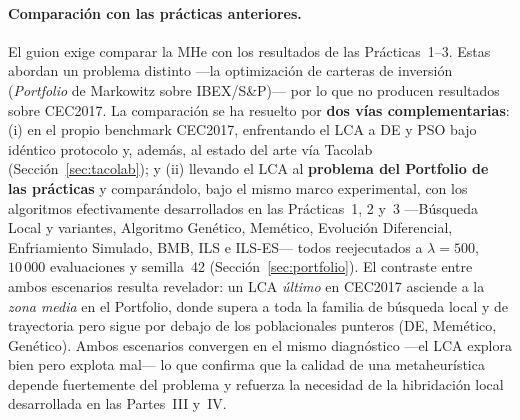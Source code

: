 \paragraph{Comparación con las prácticas anteriores.}
El guion exige comparar la MHe con los resultados de las Prácticas~1--3. Estas
abordan un problema distinto ---la optimización de carteras de inversión
(\emph{Portfolio} de Markowitz sobre IBEX/S\&P)--- por lo que no producen
resultados sobre CEC2017. La comparación se ha resuelto por \textbf{dos vías
complementarias}: (i) en el propio benchmark CEC2017, enfrentando el LCA a DE y
PSO bajo idéntico protocolo y, además, al estado del arte vía Tacolab
(Sección~\ref{sec:tacolab}); y (ii) llevando el LCA al \textbf{problema del
Portfolio de las prácticas} y comparándolo, bajo el mismo marco experimental, con
los algoritmos efectivamente desarrollados en las Prácticas~1, 2 y~3 ---Búsqueda
Local y variantes, Algoritmo Genético, Memético, Evolución Diferencial,
Enfriamiento Simulado, BMB, ILS e ILS-ES--- todos reejecutados a $\lambda=500$,
$10\,000$ evaluaciones y semilla~42 (Sección~\ref{sec:portfolio}). El contraste
entre ambos escenarios resulta revelador: un LCA \emph{último} en CEC2017 asciende
a la \emph{zona media} en el Portfolio, donde supera a toda la familia de búsqueda
local y de trayectoria pero sigue por debajo de los poblacionales punteros
(DE, Memético, Genético). Ambos escenarios convergen en el mismo diagnóstico ---el
LCA explora bien pero explota mal--- lo que confirma que la calidad de una
metaheurística depende fuertemente del problema y refuerza la necesidad de la
hibridación local desarrollada en las Partes~III y~IV.

